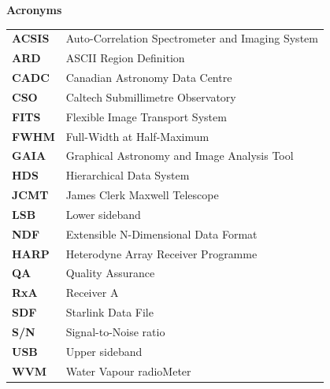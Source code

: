 \documentclass[twoside,11pt]{article}
\newenvironment{latexonly}{}{}
\renewcommand{\_}{\texttt{\symbol{95}}}
\renewcommand{\thepage}{\roman{page}}
\begin{document}
\newpage
\begin{latexonly}
   \vspace{10mm}
   \begin{center}
      {\Large\textbf{Acronyms}}
   \end{center}
\setlength{\extrarowheight}{3pt}
\begin{table}[h!]
\begin{tabular}{ll}

\textbf{ACSIS}& Auto-Correlation Spectrometer and Imaging System\\
\textbf{ARD}& ASCII Region Definition\\
\textbf{CADC}& Canadian Astronomy Data Centre\\
\textbf{CSO}& Caltech Submillimetre Observatory\\
\textbf{FITS}& Flexible Image Transport System\\
\textbf{FWHM}& Full-Width at Half-Maximum\\
\textbf{GAIA}& Graphical Astronomy and Image Analysis Tool\\
\textbf{HDS}& Hierarchical Data System\\
\textbf{JCMT}& James Clerk Maxwell Telescope\\
\textbf{LSB}& Lower sideband\\
\textbf{NDF}& Extensible N-Dimensional Data Format\\
\textbf{HARP}& Heterodyne Array Receiver Programme\\
\textbf{QA}& Quality Assurance\\
\textbf{RxA}& Receiver A\\
\textbf{SDF}& Starlink Data File\\
\textbf{S/N}& Signal-to-Noise ratio\\
\textbf{USB}& Upper sideband\\
\textbf{WVM}& Water Vapour radioMeter\\
\end{tabular}
\end{table}

\end{latexonly}


\cleardoublepage
\renewcommand{\thepage}{\arabic{page}}
\setcounter{page}{1}
\end{document}

